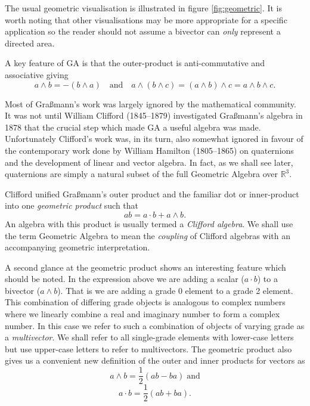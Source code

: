 The usual geometric visualisation is illustrated in figure \ref{fig:geometric}.
It is worth noting that other visualisations may be more appropriate for a specific
application so the reader should not assume a bivector can \emph{only} represent a
directed area. 

A key feature of GA is that the outer-product is anti-commutative and
associative giving
\begin{displaymath}
a \wedge b = - ( b \wedge a)\quad\mbox{and}\quad
a \wedge (b \wedge c) = (a \wedge b) \wedge c = a \wedge b \wedge c.
\end{displaymath}

Most of Gra{\ss}mann's work was largely ignored by the mathematical community.
It was not until William Clifford (1845--1879) investigated Gra{\ss}mann's
algebra in 1878\cite{GA:clifford} that the crucial step which made GA a useful
algebra was made. Unfortunately Clifford's work was, in its turn, also
somewhat ignored in favour of the contemporary work done by William Hamilton (1805--1865) 
on quaternions and
the development of linear and vector algebra. In fact, as we shall see later,
quaternions are simply a natural subset of the full Geometric Algebra over 
$\mathbb{R}^3$.

Clifford unified Gra{\ss}mann's outer product and the familiar dot
or inner-product into one \emph{geometric product} such that
\begin{displaymath}
ab = a\cdot b + a \wedge b.
\end{displaymath}
An algebra with this product is usually termed a \emph{Clifford algebra}. We
shall use the term Geometric Algebra to mean the \emph{coupling} of Clifford
algebras with an accompanying geometric interpretation.

A second glance at the geometric product shows an interesting feature which
should be noted. In the expression above we are adding a scalar ($a \cdot b$)
to a bivector ($a \wedge b$). That is we are adding a grade 0 element to a
grade 2 element. This combination of differing grade objects is analogous to
complex numbers where we linearly combine a real and imaginary number to form
a complex number. In this case we refer to such a combination of objects of
varying grade as a \emph{multivector}.  We shall refer to all
single-grade elements with lower-case letters but use upper-case letters to
refer to multivectors. The geometric product also gives us a convenient new
definition of the outer and inner products for vectors as
\[
a \wedge b = \frac{1}{2}(ab - ba)\;\mbox{and}
\]
\[
a \cdot b = \frac{1}{2}(ab + ba).
\]

